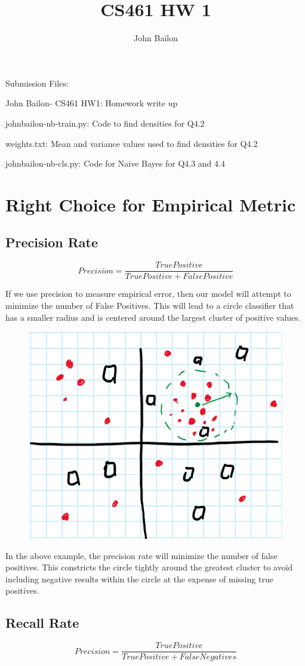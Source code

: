 \documentclass{article}
\title{CS461 HW 1}
\author{John Bailon}
\begin{document}
\maketitle

\noindent
Submission Files:

\noindent
John Bailon- CS461 HW1: Homework write up

\noindent
johnbailon-nb-train.py: Code to find densities for Q4.2

\noindent
weights.txt: Mean and variance values used to find densities for Q4.2

\noindent
johnbailon-nb-cls.py: Code for Naive Bayes for Q4.3 and 4.4 

\section{Right Choice for Empirical Metric}

\subsection{Precision Rate}
\[Precision = \frac{True Positive}{True Positive + False Positive}\]

\noindent
If we use precision to measure empirical error, then our model will attempt to minimize the number of False Positives. This will lead to a circle classifier that has a smaller radius and is centered around the largest cluster of positive values.

\begin{figure}[h]
\centering
\includegraphics[width=0.35\linewidth]{Precision Figure.png}
\end{figure}

In the above example, the precision rate will minimize the number of false positives. This constricts the circle tightly around the greatest cluster to avoid including negative results within the circle at the expense of missing true positives.

\subsection{Recall Rate}
\[Precision = \frac{True Positive}{True Positive + False Negatives}\]
\end{document}
